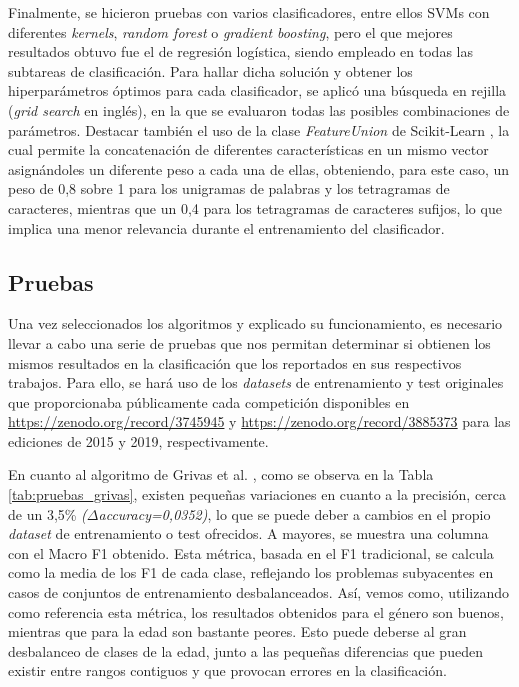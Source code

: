 Finalmente, se hicieron pruebas con varios clasificadores, entre ellos SVMs con diferentes \textit{kernels}, \textit{random forest} o \textit{gradient boosting}, pero el que mejores resultados
obtuvo fue el de regresión logística, siendo empleado en todas las subtareas de clasificación. Para hallar dicha solución y obtener los hiperparámetros óptimos para cada
clasificador, se aplicó una búsqueda en rejilla (\textit{grid search} en inglés), en la que se evaluaron todas las posibles combinaciones de parámetros.
Destacar también el uso de la clase \textit{FeatureUnion} de Scikit-Learn \cite{scikitlearn}, la cual permite la concatenación de diferentes características en un mismo vector asignándoles
un diferente peso a cada una de ellas, obteniendo, para este caso, un peso de 0,8 sobre 1 para los unigramas de palabras y los tetragramas de caracteres, mientras que un 0,4 para los tetragramas de caracteres sufijos,
lo que implica una menor relevancia durante el entrenamiento del clasificador.

\subsection{Pruebas}

Una vez seleccionados los algoritmos y explicado su funcionamiento, es necesario llevar a cabo una serie de pruebas que nos permitan determinar
si obtienen los mismos resultados en la clasificación que los reportados en sus respectivos trabajos.
Para ello, se hará uso de los \textit{datasets} de entrenamiento y test originales que proporcionaba públicamente cada competición disponibles
en \url{https://zenodo.org/record/3745945} y \url{https://zenodo.org/record/3885373} para las ediciones de 2015 y 2019, respectivamente.

\bigskip
En cuanto al algoritmo de Grivas et al. \cite{grivas2015author}, como se observa en la Tabla \ref{tab:pruebas_grivas}, existen pequeñas variaciones en
cuanto a la precisión, cerca de un 3,5\% 	\textit{($\Delta$accuracy=0,0352)}, lo que se puede deber a cambios en el propio \textit{dataset} de entrenamiento o test ofrecidos. A mayores,
se muestra una columna con el Macro F1 obtenido. Esta métrica, basada en el F1 tradicional, se calcula como la media de los F1 de cada clase,
reflejando los problemas subyacentes en casos de conjuntos de entrenamiento desbalanceados.
Así, vemos como, utilizando como referencia esta métrica, los resultados obtenidos para el género son buenos, mientras que para la edad son bastante peores. Esto puede deberse al gran
desbalanceo de clases de la edad, junto a las pequeñas diferencias que pueden existir entre rangos contiguos y que provocan errores en la clasificación.

